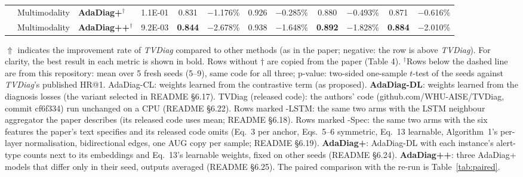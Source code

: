 \begin{table}[!ht]
\begin{tabular}{c c l c c c c c c c c c}
 & Multimodality & \textbf{AdaDiag+}$^\dagger$ & 1.1E-01 & 0.831 & $-$1.176\% & 0.926 & $-$0.285\% & 0.880 & $-$0.493\% & 0.871 & $-$0.616\% \\
 & Multimodality & \textbf{AdaDiag++}$^\dagger$ & 9.2E-03 & \textbf{0.844} & $-$2.678\% & 0.938 & $-$1.648\% & \textbf{0.892} & $-$1.828\% & \textbf{0.884} & $-$2.010\% \\
\bottomrule
\end{tabular}
\par\vspace{4pt}
\begin{minipage}{\linewidth}\footnotesize
$\Uparrow$ indicates the improvement rate of \textit{TVDiag} compared to other methods (as in the paper; negative: the row is above \textit{TVDiag}). For clarity, the best result in each metric is shown in bold.
 Rows without $\dagger$ are copied from the paper (Table 4). $^\dagger$Rows below the dashed line are from this repository: mean over 5 fresh seeds (5--9), same code for all three; p-value: two-sided one-sample $t$-test of the seeds against \textit{TVDiag}'s published HR@1. AdaDiag-CL: weights learned from the contrastive term (as proposed). \textbf{AdaDiag-DL}: weights learned from the diagnosis losses (the variant selected in README \S6.17). TVDiag (released code): the authors' code (github.com/WHU-AISE/TVDiag, commit cf6f334) run unchanged on a CPU (README \S6.22). Rows marked -LSTM: the same two arms with the LSTM neighbour aggregator the paper describes (its released code uses mean; README \S6.18). Rows marked -Spec: the same two arms with the six features the paper's text specifies and its released code omits (Eq.~3 per anchor, Eqs.~5--6 symmetric, Eq.~13 learnable, Algorithm~1's per-layer normalisation, bidirectional edges, one AUG copy per sample; README \S6.19). \textbf{AdaDiag+}: AdaDiag-DL with each instance's alert-type counts next to its embeddings and Eq.~13's learnable weights, fixed on other seeds (README \S6.24). \textbf{AdaDiag++}: three AdaDiag+ models that differ only in their seed, outputs averaged (README \S6.25). The paired comparison with the re-run is Table~\ref{tab:paired}.
\end{minipage}
\end{table}
